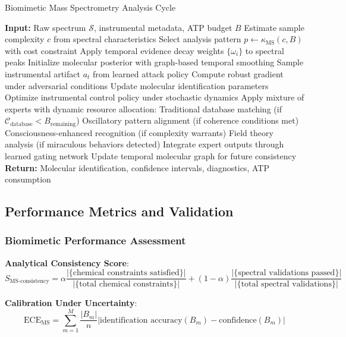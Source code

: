 \documentclass[11pt,a4paper]{article}
\theoremstyle{remark}
\begin{document}
\begin{algorithm}[H]
\caption{Biomimetic Mass Spectrometry Analysis Cycle}
\begin{algorithmic}[1]
\State \textbf{Input:} Raw spectrum $\mathcal{S}$, instrumental metadata, ATP budget $B$
\State Estimate sample complexity $c$ from spectral characteristics
\State Select analysis pattern $p \gets \kappa_{\text{MS}}(c, B)$ with cost constraint
\State Apply temporal evidence decay weights $\{\omega_i\}$ to spectral peaks
\State Initialize molecular posterior with graph-based temporal smoothing
    \State Sample instrumental artifact $a_t$ from learned attack policy
    \State Compute robust gradient under adversarial conditions
    \State Update molecular identification parameters
\EndFor
\State Optimize instrumental control policy under stochastic dynamics
\State Apply mixture of experts with dynamic resource allocation:
    \State \quad Traditional database matching (if $\mathcal{C}_{\text{database}} < B_{\text{remaining}}$)
    \State \quad Oscillatory pattern alignment (if coherence conditions met)
    \State \quad Consciousness-enhanced recognition (if complexity warrants)
    \State \quad Field theory analysis (if miraculous behaviors detected)
\State Integrate expert outputs through learned gating network
\State Update temporal molecular graph for future consistency
\State \textbf{Return:} Molecular identification, confidence intervals, diagnostics, ATP consumption
\end{algorithmic}
\end{algorithm}

\subsection{Performance Metrics and Validation}

\subsubsection{Biomimetic Performance Assessment}

\textbf{Analytical Consistency Score}:
\begin{equation}
S_{\text{MS-consistency}} = \alpha \frac{|\{\text{chemical constraints satisfied}\}|}{|\{\text{total chemical constraints}\}|} + (1-\alpha) \frac{|\{\text{spectral validations passed}\}|}{|\{\text{total spectral validations}\}|}
\end{equation}

\textbf{Calibration Under Uncertainty}:
\begin{equation}
\text{ECE}_{\text{MS}} = \sum_{m=1}^{M} \frac{|B_m|}{n} \left|\text{identification accuracy}(B_m) - \text{confidence}(B_m)\right|
\end{equation}
\end{document}
